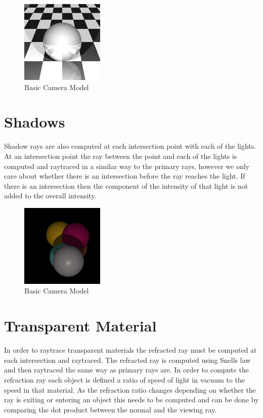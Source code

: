 \documentclass{article}
\begin{document}
\begin{figure}[H]
  \begin{center}
  \includegraphics[width=150px]{Images/gridSphere.png}
  \caption{Basic Camera Model}
  \label{fig:basiccammod}
  \end{center}
\end{figure}

\section{Shadows}

Shadow rays are also computed at each intersection point with each of the lights.
At an intersection point the ray between the point and each of the lights is computed
and raytraced in a similar way to the primary rays, however we only care about whether
there is an intersection before the ray reaches the light. If there is an intersection
then the component of the intensity of that light is not added to the overall intensity.

\begin{figure}[H]
  \begin{center}
  \includegraphics[width=150px]{Images/shadows.png}
  \caption{Basic Camera Model}
  \label{fig:basiccammod}
  \end{center}
\end{figure}

\section{Transparent Material}

In order to raytrace transparent materials the refracted ray must be computed at
each intersection and raytraced. The refracted ray is computed using Snells law
and then raytraced the same way as primary rays are. In order to compute the refraction
ray each object is defined a ratio of speed of light in vacuum to the speed in that
material. As the refraction ratio changes depending on whether the ray is exiting
or entering an object this needs to be computed and can be done by comparing
the dot product between the normal and the viewing ray.\\
\end{document}
